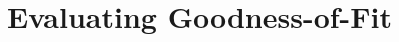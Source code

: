 \begin{comment}
Node statistics
	 node	 mean	 sd	 MC error	2.5%
	D	5.939	1.009	0.01712	4.18	5.822	8.211	1001	27000
	N	39.78	6.756	0.1147	28.0	39.0	55.0	1001	27000
	X1new	9.006	2.701	0.02151	4.603	8.699	15.18	1001	27000
	X1obs	11.98	3.396	0.04019	6.437	11.61	19.69	1001	27000
	X3new	13.13	3.218	0.01885	7.748	12.84	20.26	1001	27000
	X3obs	21.4	2.116	0.02102	17.83	21.2	26.11	1001	27000
	Xnew	61.54	6.483	0.0668	49.39	61.26	74.8	1001	27000
	Xobs	88.74	6.003	0.06467	77.85	88.46	101.4	1001	27000
	alpha.sex	-0.4355	1.192	0.01962	-2.624	-0.6607	2.605	1001	27000
	beta	1.257	2.088	0.1191	0.06376	1.036	6.652	1001	27000
	beta.sex	0.5605	1.675	0.06955	-2.723	0.7576	2.92	1001	27000
	deviance	438.9	12.25	0.1858	417.0	438.0	464.9	1001	27000
	logitp0	-2.598	0.287	0.01129	-3.088	-2.624	-1.998	1001	27000
	mod[1]	0.5939	0.4911	0.01784	0.0	1.0	1.0	1001	27000
	mod[2]	0.5251	0.4994	0.02614	0.0	1.0	1.0	1001	27000
	psi	0.3312	0.06925	0.001093	0.2101	0.3264	0.4776	1001	27000
	psi.sex	0.5425	0.1038	0.002119	0.3366	0.5443	0.7389	1001	27000
	sigma	1.045	0.6963	0.04014	0.2743	0.6947	2.801	1001	27000



\end{verbatim}







\end{comment}




\section{Evaluating Goodness-of-Fit}

